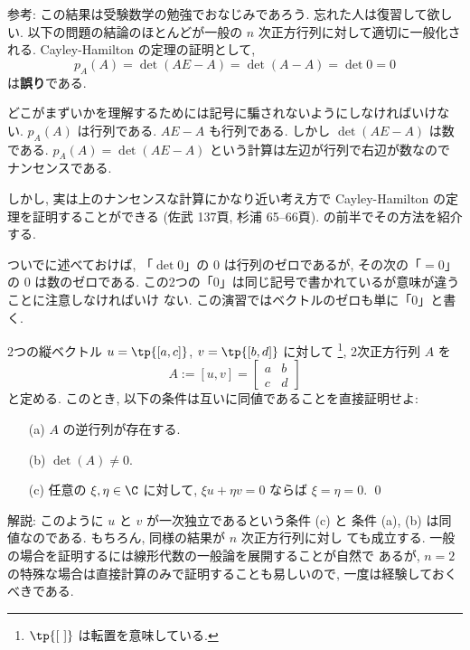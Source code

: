 \documentclass[12pt,twoside]{jarticle}
\begin{document}
\noindent 
参考: この結果は受験数学の勉強でおなじみであろう.
忘れた人は復習して欲しい.  
以下の問題の結論のほとんどが一般の $n$ 次正方行列に対して適切に一般化される. 
Cayley-Hamilton の定理の証明として,
\begin{equation*}
 p_A(A) = \det(AE - A) = \det(A - A) = \det 0 = 0
\end{equation*}
は{\bf 誤り}である. 

どこがまずいかを理解するためには記号に騙されないようにしなければいけない.
$p_A(A)$ は行列である.  $AE - A$ も行列である.  
しかし $\det(AE-A)$ は数である.  
$p_A(A)=\det(AE-A)$ という計算は左辺が行列で右辺が数なのでナンセンスである.

しかし, 実は上のナンセンスな計算にかなり近い考え方で 
Cayley-Hamilton の定理を証明することができる
(佐武 \cite{satake} 137頁, 杉浦 \cite{sugiura} 65--66頁).
 の前半でその方法を紹介する.

ついでに述べておけば, 「$\det 0$」の $0$ は行列のゼロであるが, 
その次の「$= 0$」の $0$ は数のゼロである.
この2つの「$0$」は同じ記号で書かれているが意味が違うことに注意しなければいけ
ない.  この演習ではベクトルのゼロも単に「$0$」と書く.


\begin{question}[5点]
  2つの縦ベクトル %
  $u=\tp{[a, c]}$, $v=\tp{[b, d]}$ に対して%
  \footnote{$\tp{[\ ]}$ は転置を意味している.}, 2次正方行列 $A$ を
  \begin{equation*}
    A := [u, v] = \begin{bmatrix} a & b \\ c & d \end{bmatrix}
  \end{equation*}
  と定める. このとき, 以下の条件は互いに同値であることを直接証明せよ:
  \begin{enumerate}
  \item[(a)] $A$ の逆行列が存在する.
  \item[(b)] $\det(A) \ne 0$.
  \item[(c)] 任意の $\xi,\eta\in\C$ に対して, %
    $\xi u + \eta v = 0$ ならば $\xi = \eta = 0$.
  \qed
  \end{enumerate}
\end{question}

\noindent 
解説: このように $u$ と $v$ が一次独立であるという条件 (c) と
条件 (a), (b) は同値なのである. もちろん, 同様の結果が $n$ 次正方行列に対し
ても成立する. 一般の場合を証明するには線形代数の一般論を展開することが自然で
あるが, $n=2$ の特殊な場合は直接計算のみで証明することも易しいので, 
一度は経験しておくべきである.
\end{document}
